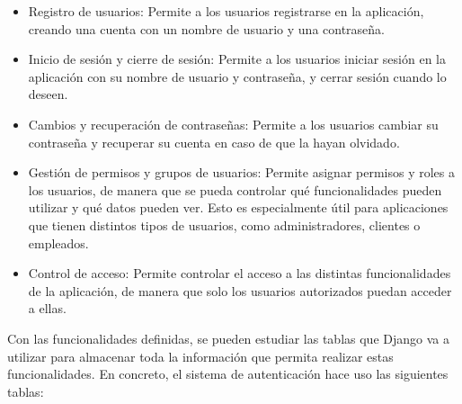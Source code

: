 \begin{itemize}
    \item Registro de usuarios: Permite a los usuarios registrarse en la aplicación, creando una cuenta con un nombre de usuario y una contraseña.
    \item Inicio de sesión y cierre de sesión: Permite a los usuarios iniciar sesión en la aplicación con su nombre de usuario y contraseña, y cerrar sesión cuando lo deseen.
    \item Cambios y recuperación de contraseñas: Permite a los usuarios cambiar su contraseña y recuperar su cuenta en caso de que la hayan olvidado.
    \item Gestión de permisos y grupos de usuarios: Permite asignar permisos y roles a los usuarios, de manera que se pueda controlar qué funcionalidades pueden utilizar y qué datos pueden ver. Esto es especialmente útil para aplicaciones que tienen distintos tipos de usuarios, como administradores, clientes o empleados.
    \item Control de acceso: Permite controlar el acceso a las distintas funcionalidades de la aplicación, de manera que solo los usuarios autorizados puedan acceder a ellas.
\end{itemize}

Con las funcionalidades definidas, se pueden estudiar las tablas que Django va a utilizar para almacenar toda la información que permita realizar estas funcionalidades. En concreto, el sistema de autenticación hace uso las siguientes tablas:

